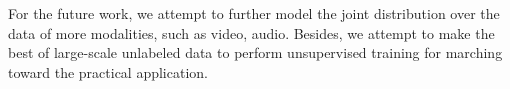 \documentclass[journal]{IEEEtran}
\begin{document}
For the future work, we attempt to further model the joint distribution over the data of more modalities, such as video, audio. Besides, we attempt to make the best of large-scale unlabeled data to perform unsupervised training for marching toward the practical application.









\ifCLASSOPTIONcaptionsoff
  \newpage
\fi







\end{document}
